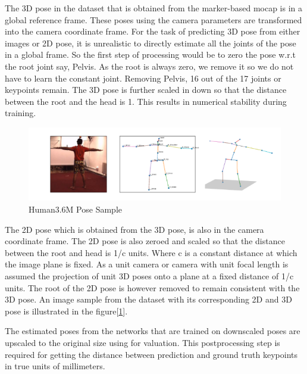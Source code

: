The 3D pose in the dataset that is obtained from the marker-based \ac{mocap} is in a global reference frame. These poses using the camera parameters are transformed into the camera coordinate frame. For the task of predicting 3D pose from either images or 2D pose, it is unrealistic to directly estimate all the joints of the pose in a global frame. So the first step of processing would be to zero the pose w.r.t the root joint say, Pelvis. As the root is always zero, we remove it so we do not have to learn the constant joint. Removing Pelvis, 16 out of the 17 joints or keypoints remain. The 3D pose is further scaled in down so that the distance between the root and the head is 1. This results in numerical stability during training.

\begin{figure}[h]
    \centering
    \includegraphics[width=\textwidth]{figures/h36_viz/h36poses.png}
    \caption{Human3.6M Pose Sample}
    \label{fig:h36_poses}
\end{figure}

The 2D pose which is obtained from the 3D pose, is also in the camera coordinate frame. The 2D pose is also zeroed and scaled so that the distance between the root and head is 1/c units. Where c is a constant distance at which the image plane is fixed. As a unit camera or camera with unit focal length is assumed the projection of unit 3D poses onto a plane at a fixed distance of 1/c units. The root of the 2D pose is however removed to remain consistent with the 3D pose. An image sample from the dataset with its corresponding 2D and 3D pose is illustrated in the figure[\ref{fig:h36_poses}].


The estimated poses from the networks that are trained on downscaled poses are upscaled to the original size using for valuation. This postprocessing step is required for getting the distance between prediction and ground truth keypoints in true units of millimeters.


